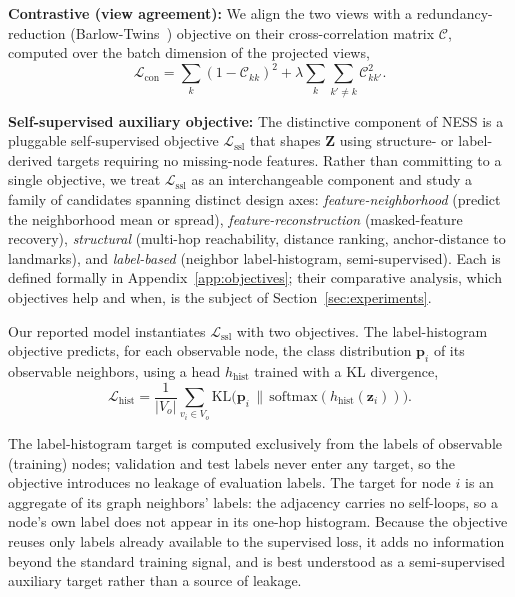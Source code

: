 \textbf{Contrastive (view agreement):}
We align the two views with a redundancy-reduction (Barlow-Twins~\cite{zbontar2021barlow})
objective on their cross-correlation matrix $\mathcal{C}$, computed over the batch
dimension of the projected views,
\begin{equation}
    \label{eq:con}
    \mathcal{L}_{\text{con}}
    = \sum_{k}(1-\mathcal{C}_{kk})^2
      + \lambda \sum_{k}\sum_{k'\neq k}\mathcal{C}_{kk'}^2 .
\end{equation}


\textbf{Self-supervised auxiliary objective:} The distinctive component of NESS is a pluggable self-supervised objective $\mathcal{L}_{\text{ssl}}$ that shapes $\mathbf{Z}$ using structure- or label-derived targets requiring no missing-node features. Rather than committing to a single objective, we treat $\mathcal{L}_{\text{ssl}}$ as an interchangeable component and study a family of candidates spanning distinct design axes: \emph{feature-neighborhood} (predict the neighborhood mean or spread), \emph{feature-reconstruction} (masked-feature recovery), \emph{structural} (multi-hop reachability, distance ranking, anchor-distance to landmarks), and \emph{label-based} (neighbor label-histogram, semi-supervised). Each is defined formally in Appendix~\ref{app:objectives}; their comparative analysis, which objectives help and when, is the subject of Section~\ref{sec:experiments}.

Our reported model instantiates $\mathcal{L}_{\text{ssl}}$ with two objectives. The label-histogram objective predicts, for each observable node, the class distribution $\mathbf{p}_i$ of its observable neighbors, using a head $h_{\text{hist}}$ trained with a KL divergence,
\begin{equation}
    \label{eq:hist}
    \mathcal{L}_{\text{hist}} = \frac{1}{|V_o|}\sum_{v_i\in V_o}
      \mathrm{KL}\big(\mathbf{p}_i \,\|\, \mathrm{softmax}(h_{\text{hist}}(\mathbf{z}_i))\big).
\end{equation}

The label-histogram target is computed exclusively from the labels of observable (training) nodes; validation and test labels never enter any target, so the objective introduces no leakage of evaluation labels. The target for node $i$ is an aggregate of its graph neighbors' labels: the adjacency carries no self-loops, so a node's own label does not appear in its one-hop histogram. Because the objective reuses only labels already available to the supervised loss, it adds no information beyond the standard training signal, and is best understood as a semi-supervised auxiliary target rather than a source of leakage.


